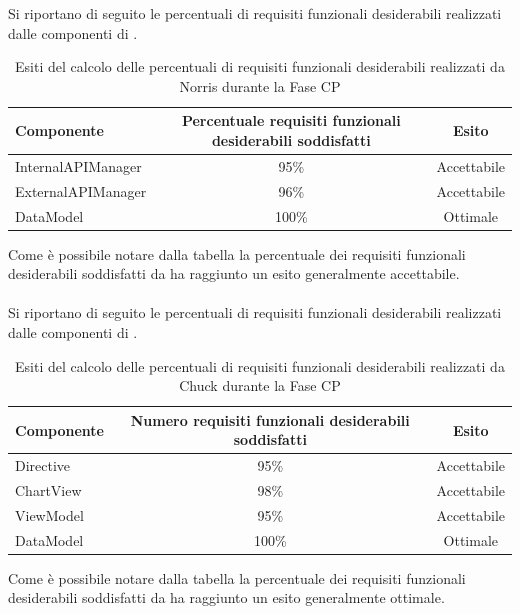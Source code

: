
Si riportano di seguito le percentuali di requisiti funzionali desiderabili realizzati dalle componenti di .
\begin{table}[H]
	\centering
		\begin{tabu}{| l | c | c |}
			\hline
			Componente	& Percentuale requisiti funzionali desiderabili soddisfatti	& Esito		\\ \hline \hline
			InternalAPIManager	& 95\% 	& Accettabile  \\ \hline
			ExternalAPIManager  & 	96\%	& Accettabile  \\ \hline
			DataModel  & 	100\%	& Ottimale  \\ \hline
		\end{tabu}
	\caption{Esiti del calcolo delle percentuali di requisiti funzionali desiderabili realizzati da Norris durante la Fase CP}
\end{table}
Come è possibile notare dalla tabella la percentuale dei requisiti funzionali desiderabili soddisfatti da  ha raggiunto un esito generalmente accettabile. 
\\ \\
Si riportano di seguito le percentuali di requisiti funzionali desiderabili realizzati dalle componenti di .
\begin{table}[H]
	\centering
		\begin{tabu}{| l | c | c |}
			\hline
			Componente	& Numero requisiti funzionali desiderabili soddisfatti	& Esito		\\ \hline \hline
			Directive	& 95\% 	& Accettabile  \\ \hline
			ChartView  & 	98\%	& Accettabile  \\ \hline
			ViewModel  & 	95\%	& Accettabile  \\ \hline
			DataModel  & 	100\%	& Ottimale  \\ \hline
		\end{tabu}
	\caption{Esiti del calcolo delle percentuali di requisiti funzionali desiderabili realizzati da Chuck durante la Fase CP}
\end{table}
Come è possibile notare dalla tabella la percentuale dei requisiti funzionali desiderabili soddisfatti da  ha raggiunto un esito generalmente ottimale.


